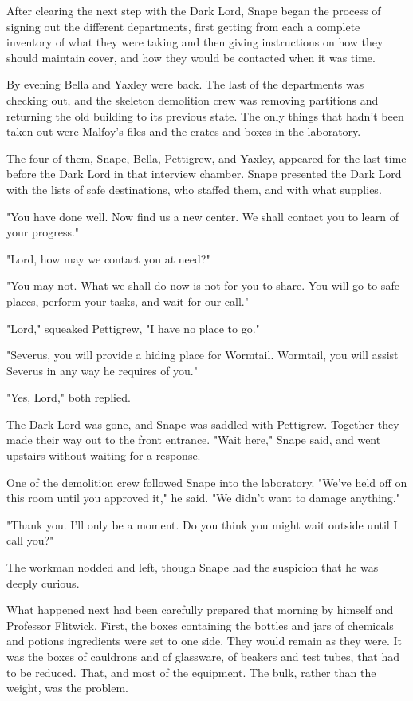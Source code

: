 After clearing the next step with the Dark Lord, Snape began the process of signing out the different departments, first getting from each a complete inventory of what they were taking and then giving instructions on how they should maintain cover, and how they would be contacted when it was time.

By evening Bella and Yaxley were back. The last of the departments was checking out, and the skeleton demolition crew was removing partitions and returning the old building to its previous state. The only things that hadn't been taken out were Malfoy's files and the crates and boxes in the laboratory.

The four of them, Snape, Bella, Pettigrew, and Yaxley, appeared for the last time before the Dark Lord in that interview chamber. Snape presented the Dark Lord with the lists of safe destinations, who staffed them, and with what supplies.

"You have done well. Now find us a new center. We shall contact you to learn of your progress."

"Lord, how may we contact you at need?"

"You may not. What we shall do now is not for you to share. You will go to safe places, perform your tasks, and wait for our call."

"Lord," squeaked Pettigrew, "I have no place to go."

"Severus, you will provide a hiding place for Wormtail. Wormtail, you will assist Severus in any way he requires of you."

"Yes, Lord," both replied.

The Dark Lord was gone, and Snape was saddled with Pettigrew. Together they made their way out to the front entrance. "Wait here," Snape said, and went upstairs without waiting for a response.

One of the demolition crew followed Snape into the laboratory. "We've held off on this room until you approved it," he said. "We didn't want to damage anything."

"Thank you. I'll only be a moment. Do you think you might wait outside until I call you?"

The workman nodded and left, though Snape had the suspicion that he was deeply curious.

What happened next had been carefully prepared that morning by himself and Professor Flitwick. First, the boxes containing the bottles and jars of chemicals and potions ingredients were set to one side. They would remain as they were. It was the boxes of cauldrons and of glassware, of beakers and test tubes, that had to be reduced. That, and most of the equipment. The bulk, rather than the weight, was the problem.

